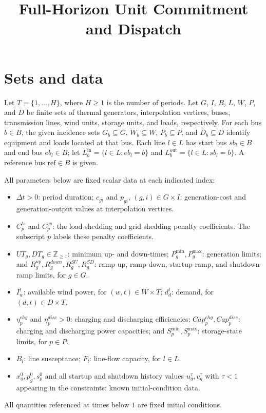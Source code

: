 \documentclass[11pt,a4paper]{article}
\title{Full-Horizon Unit Commitment and Dispatch}
\author{}
\date{}
\begin{document}
\maketitle

\section{Sets and data}
Let $T=\{1,\ldots,H\}$, where $H\geq1$ is the number of periods. Let $G$, $I$, $B$, $L$, $W$, $P$, and $D$ be finite sets of thermal generators, interpolation vertices, buses, transmission lines, wind units, storage units, and loads, respectively. For each bus $b\in B$, the given incidence sets $G_b\subseteq G$, $W_b\subseteq W$, $P_b\subseteq P$, and $D_b\subseteq D$ identify equipment and loads located at that bus. Each line $l\in L$ has start bus $sb_l\in B$ and end bus $eb_l\in B$; let $L_b^{\mathrm{in}}=\{l\in L:eb_l=b\}$ and $L_b^{\mathrm{out}}=\{l\in L:sb_l=b\}$. A reference bus $\mathrm{ref}\in B$ is given.

All parameters below are fixed scalar data at each indicated index:
\begin{itemize}
\item $\Delta t>0$: period duration; $c_{gi}$ and $p_{gi}$, $(g,i)\in G\times I$: generation-cost and generation-output values at interpolation vertices.
\item $C_p^{ls}$ and $C_p^{gs}$: the load-shedding and grid-shedding penalty coefficients. The subscript $p$ labels these penalty coefficients.
\item $UT_g,DT_g\in\mathbb Z_{\geq1}$: minimum up- and down-times; $P_g^{\min},P_g^{\max}$: generation limits; and $R_g^{up},R_g^{down},R_g^{SU},R_g^{SD}$: ramp-up, ramp-down, startup-ramp, and shutdown-ramp limits, for $g\in G$.
\item $I_w^t$: available wind power, for $(w,t)\in W\times T$; $d_d^t$: demand, for $(d,t)\in D\times T$.
\item $\eta_p^{chg}$ and $\eta_p^{disc}>0$: charging and discharging efficiencies; $Cap_p^{chg},Cap_p^{disc}$: charging and discharging power capacities; and $S_p^{\min},S_p^{\max}$: storage-state limits, for $p\in P$.
\item $B_l$: line susceptance; $F_l$: line-flow capacity, for $l\in L$.
\item $x_g^0,p_g^0,s_p^0$ and all startup and shutdown history values $u_g^\tau,v_g^\tau$ with $\tau<1$ appearing in the constraints: known initial-condition data.
\end{itemize}
All quantities referenced at times below $1$ are fixed initial conditions.
\end{document}
